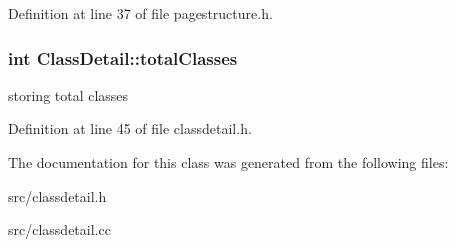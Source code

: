 Definition at line 37 of file pagestructure.\-h.

\hypertarget{classClassDetail_a4c3d277d14ead4f704afcbd754b1ebf0}{
\subsubsection[{total\-Classes}]{\setlength{\rightskip}{0pt plus 5cm}int Class\-Detail\-::total\-Classes\hspace{0.3cm}{\ttfamily [protected]}}}\label{classClassDetail_a4c3d277d14ead4f704afcbd754b1ebf0}
storing total classes 

Definition at line 45 of file classdetail.\-h.



The documentation for this class was generated from the following files\-:\begin{DoxyCompactItemize}
\item 
src/classdetail.\-h\item 
src/classdetail.\-cc\end{DoxyCompactItemize}
